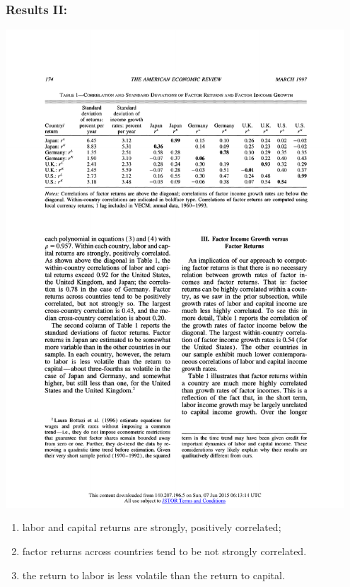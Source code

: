 \documentclass[10pt]{beamer}
\begin{document}
\begin{frame}[c]\frametitle{Results II:}

\begin{center}
\includegraphics[width=0.95\textwidth]{table1.pdf}
\end{center}
\begin{enumerate}
    \item  labor and capital returns are strongly, positively correlated;
    \item factor returns across countries tend to be not strongly correlated.
    \item the return to labor is less volatile than the return to capital.
\end{enumerate}

\end{frame}
\end{document}
